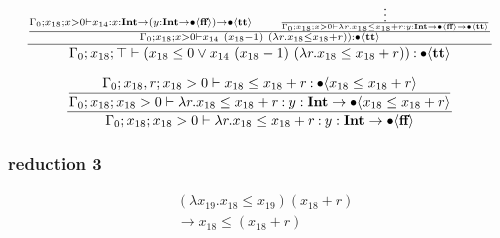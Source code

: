 \documentclass{article}
\begin{document}
\begin{align*}
\frac{
 \frac{
 \Gamma_0; x_{18}; x > 0 \vdash
    x_{14} \mathbin{:} {x} : \textbf{Int} \to ({y} : \textbf{Int} \to \bullet \langle \textbf{ff} \rangle) \to \bullet \langle \textbf{tt} \rangle
    \qquad
    \frac{\vdots}{
 \Gamma_0; x_{18}; x > 0 \vdash
    \lambda r. x_{18} \leq x_{18} + r \mathbin{:} {y} : \textbf{Int} \to \bullet \langle \textbf{ff} \rangle \to \bullet \langle \textbf{tt} \rangle
}
 }{
 \Gamma_0; x_{18}; x > 0 \vdash
    x_{14}\ (x_{18} - 1)\  (\lambda r. x_{18} \leq x_{18} + r)) \mathbin{:}
    \bullet \langle \textbf{tt} \rangle
 }
}{
 \Gamma_0; x_{18}; \top \vdash (x_{18} \leq 0 \vee
    x_{14}\ (x_{18} - 1)\  (\lambda r. x_{18} \leq x_{18} + r)) \mathbin{:}
    \bullet \langle \textbf{tt} \rangle
}
\end{align*}

\begin{align*}
\dfrac{
\dfrac{
        \Gamma_0; x_{18}, r; x_{18} > 0 \vdash
    x_{18} \leq x_{18} + r \mathbin{:} \bullet \langle x_{18} \leq x_{18} + r \rangle
}{
        \Gamma_0; x_{18}; x_{18} > 0 \vdash
    \lambda r. x_{18} \leq x_{18} + r \mathbin{:} {y} : \textbf{Int} \to \bullet \langle x_{18} \leq x_{18} + r \rangle
}}
    {
        \Gamma_0; x_{18}; x_{18} > 0 \vdash
    \lambda r. x_{18} \leq x_{18} + r \mathbin{:} {y} : \textbf{Int} \to \bullet \langle \textbf{ff} \rangle
    }
\end{align*}

\subsubsection{reduction 3}

\begin{align*}
    &(\lambda x_{19}. x_{18} \leq x_{19}) (x_{18} + r)\\
    &\longrightarrow
    x_{18} \leq (x_{18} + r)
\end{align*}
\end{document}
